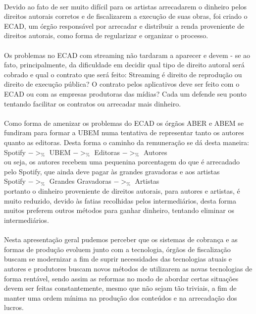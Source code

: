 \documentclass[10pt]{article}
\begin{document}
	\paragraph{}
		Devido ao fato de ser muito difícil para os artistas arrecadarem
		o dinheiro pelos direitos autorais corretos e de fiscalizarem a execução 
		de suas obras, foi criado o ECAD, um órgão responsável por arrecadar
		e distribuir a renda proveniente de direitos autorais, como forma de
		regularizar e organizar o processo.	
	\paragraph{}
		Os problemas no ECAD com streaming não tardaram a aparecer e devem - se ao fato, principalmente, da dificuldade
		em decidir qual tipo de direito autoral será cobrado e qual o contrato
		que será feito: Streaming é direito de reprodução ou direito de execução
		pública? O contrato pelos aplicativos deve ser feito com o ECAD ou com as
		empresas produtoras das mídias? Cada um defende seu ponto tentando
		facilitar os contratos ou arrecadar mais dinheiro.
	\paragraph{}
		Como forma de amenizar os problemas do ECAD os órgãos ABER e ABEM se
		fundiram para formar a UBEM numa tentativa de representar tanto os 
		autores quanto as editoras. Desta forma o caminho da remuneração se dá
		desta maneira:\\
		Spotify $->_\%$ UBEM $->_\%$ Editoras $->_\%$ Autores\\
		ou seja, os autores recebem uma pequenina porcentagem do que é arrecadado
		pelo Spotify, que ainda deve pagar às grandes gravadoras e aos artistas\\
		Spotify $->_\%$ Grandes Gravadoras $->_\%$ Artistas\\
		portanto o dinheiro proveniente de direitos autorais, para autores e artistas, é
		muito reduzido, devido às fatias recolhidas pelos intermediários, desta forma
		muitos preferem outros métodos para ganhar dinheiro, tentando eliminar
		os intermediários.
	\paragraph{}
		Nesta apresentação geral pudemos perceber que os sistemas de cobrança e
		as formas de produção evoluem junto com a tecnologia, órgãos de fiscalização
		buscam se modernizar a fim de suprir necessidades das tecnologias atuais
		e autores e produtores buscam novos métodos de utilizarem as novas
		tecnologias de forma rentável, sendo assim as reformas no modo de
		abordar certas situações devem ser feitas constantemente, mesmo que
		não sejam tão triviais, a fim de manter uma ordem mínima na produção dos
		conteúdos e na arrecadação dos lucros.
\end{document}
